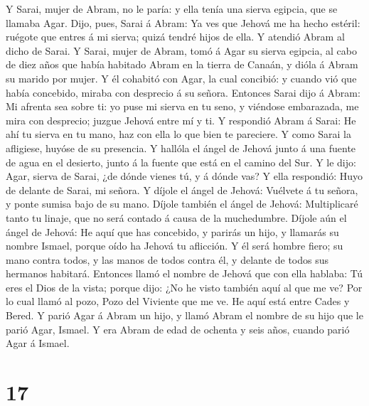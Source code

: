  Y Sarai, mujer de Abram, no le paría: y ella tenía una
sierva egipcia, que se llamaba Agar.  Dijo, pues, Sarai á
Abram: Ya ves que Jehová me ha hecho estéril: ruégote que entres á mi
sierva; quizá tendré hijos de ella. Y atendió Abram al dicho de Sarai.
 Y Sarai, mujer de Abram, tomó á Agar su sierva egipcia,
al cabo de diez años que había habitado Abram en la tierra de Canaán, y
dióla á Abram su marido por mujer.  Y él cohabitó con
Agar, la cual concibió: y cuando vió que había concebido, miraba con
desprecio á su señora.  Entonces Sarai dijo á Abram: Mi
afrenta sea sobre ti: yo puse mi sierva en tu seno, y viéndose
embarazada, me mira con desprecio; juzgue Jehová entre mí y ti.
 Y respondió Abram á Sarai: He ahí tu sierva en tu mano,
haz con ella lo que bien te pareciere. Y como Sarai la afligiese, huyóse
de su presencia.  Y hallóla el ángel de Jehová junto á una
fuente de agua en el desierto, junto á la fuente que está en el camino
del Sur.  Y le dijo: Agar, sierva de Sarai, ¿de dónde
vienes tú, y á dónde vas? Y ella respondió: Huyo de delante de Sarai, mi
señora.  Y díjole el ángel de Jehová: Vuélvete á tu
señora, y ponte sumisa bajo de su mano.  Díjole también
el ángel de Jehová: Multiplicaré tanto tu linaje, que no será contado á
causa de la muchedumbre.  Díjole aún el ángel de Jehová:
He aquí que has concebido, y parirás un hijo, y llamarás su nombre
Ismael, porque oído ha Jehová tu aflicción.  Y él será
hombre fiero; su mano contra todos, y las manos de todos contra él, y
delante de todos sus hermanos habitará.  Entonces llamó
el nombre de Jehová que con ella hablaba: Tú eres el Dios de la vista;
porque dijo: ¿No he visto también aquí al que me ve?  Por
lo cual llamó al pozo, Pozo del Viviente que me ve. He aquí está entre
Cades y Bered.  Y parió Agar á Abram un hijo, y llamó
Abram el nombre de su hijo que le parió Agar, Ismael.  Y
era Abram de edad de ochenta y seis años, cuando parió Agar á Ismael.

\hypertarget{section-16}{%
\section{17}\label{section-16}}


